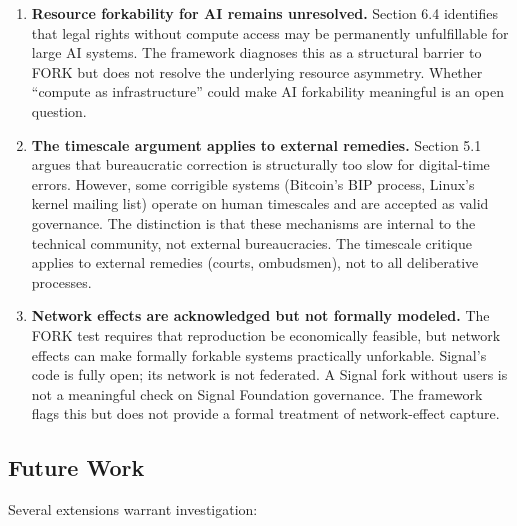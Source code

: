 \documentclass{article}
\begin{document}
\begin{enumerate}
    \item \textbf{Resource forkability for AI remains unresolved.} Section 6.4 identifies that legal rights without compute access may be permanently unfulfillable for large AI systems. The framework diagnoses this as a structural barrier to FORK but does not resolve the underlying resource asymmetry. Whether ``compute as infrastructure'' could make AI forkability meaningful is an open question.

    \item \textbf{The timescale argument applies to external remedies.} Section 5.1 argues that bureaucratic correction is structurally too slow for digital-time errors. However, some corrigible systems (Bitcoin's BIP process, Linux's kernel mailing list) operate on human timescales and are accepted as valid governance. The distinction is that these mechanisms are internal to the technical community, not external bureaucracies. The timescale critique applies to external remedies (courts, ombudsmen), not to all deliberative processes.

    \item \textbf{Network effects are acknowledged but not formally modeled.} The FORK test requires that reproduction be economically feasible, but network effects can make formally forkable systems practically unforkable. Signal's code is fully open; its network is not federated. A Signal fork without users is not a meaningful check on Signal Foundation governance. The framework flags this but does not provide a formal treatment of network-effect capture.
\end{enumerate}

\subsection{Future Work}

Several extensions warrant investigation:
\end{document}
